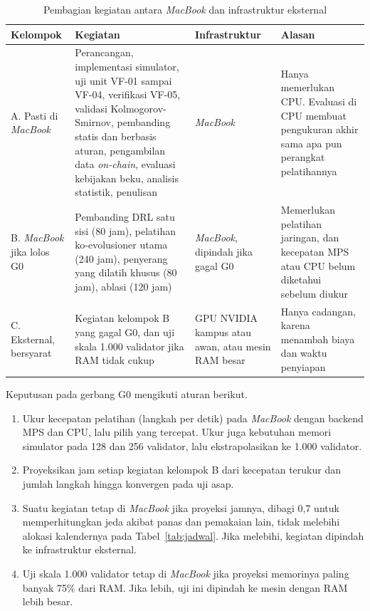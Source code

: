 \begin{table}[htbp]
\centering
\caption{Pembagian kegiatan antara \textit{MacBook} dan infrastruktur eksternal}
\label{tab:infrastruktur}
\small
\begin{tabular}{|p{2.0cm}|p{4.4cm}|p{2.4cm}|p{3.0cm}|}
\hline
\textbf{Kelompok} & \textbf{Kegiatan} & \textbf{Infrastruktur} & \textbf{Alasan} \\
\hline
A. Pasti di \textit{MacBook} & Perancangan, implementasi simulator, uji unit VF-01 sampai VF-04, verifikasi VF-05, validasi Kolmogorov-Smirnov, pembanding statis dan berbasis aturan, pengambilan data \textit{on-chain}, evaluasi kebijakan beku, analisis statistik, penulisan & \textit{MacBook} & Hanya memerlukan CPU. Evaluasi di CPU membuat pengukuran akhir sama apa pun perangkat pelatihannya \\
\hline
B. \textit{MacBook} jika lolos G0 & Pembanding DRL satu sisi (80 jam), pelatihan ko-evolusioner utama (240 jam), penyerang yang dilatih khusus (80 jam), ablasi (120 jam) & \textit{MacBook}, dipindah jika gagal G0 & Memerlukan pelatihan jaringan, dan kecepatan MPS atau CPU belum diketahui sebelum diukur \\
\hline
C. Eksternal, bersyarat & Kegiatan kelompok B yang gagal G0, dan uji skala 1.000 validator jika RAM tidak cukup & GPU NVIDIA kampus atau awan, atau mesin RAM besar & Hanya cadangan, karena menambah biaya dan waktu penyiapan \\
\hline
\end{tabular}
\end{table}

Keputusan pada gerbang G0 mengikuti aturan berikut.
\begin{enumerate}
	\item Ukur kecepatan pelatihan (langkah per detik) pada \textit{MacBook} dengan backend MPS dan CPU, lalu pilih yang tercepat. Ukur juga kebutuhan memori simulator pada 128 dan 256 validator, lalu ekstrapolasikan ke 1.000 validator.
	\item Proyeksikan jam setiap kegiatan kelompok B dari kecepatan terukur dan jumlah langkah hingga konvergen pada uji asap.
	\item Suatu kegiatan tetap di \textit{MacBook} jika proyeksi jamnya, dibagi 0,7 untuk memperhitungkan jeda akibat panas dan pemakaian lain, tidak melebihi alokasi kalendernya pada Tabel~\ref{tab:jadwal}. Jika melebihi, kegiatan dipindah ke infrastruktur eksternal.
	\item Uji skala 1.000 validator tetap di \textit{MacBook} jika proyeksi memorinya paling banyak 75\% dari RAM. Jika lebih, uji ini dipindah ke mesin dengan RAM lebih besar.
\end{enumerate}

